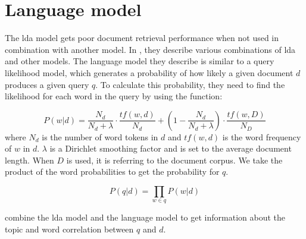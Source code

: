 \section{Language model}
The \gls{lda} model gets poor document retrieval performance when not used in combination with another model\cite{yang2009topic}.
In \cite{yang2009topic}, they describe various combinations of \gls{lda} and other models. 
The language model they describe is similar to a query likelihood model, which generates a probability of how likely a given document $d$ produces a given query $q$.
To calculate this probability, they need to find the likelihood for each word in the query by using the function:

$$ P(w|d) = \frac{N_d}{N_d + \lambda} \cdot \frac{tf(w,d)}{N_d} + (1 - \frac{N_d}{N_d + \lambda}) \cdot \frac{tf(w,D)}{N_D} $$
where $N_d$ is the number of word tokens in $d$ and $tf(w,d)$ is the word frequency of $w$ in $d$. $\lambda$ is a Dirichlet smoothing factor and is set to the average document length.
When $D$ is used, it is referring to the document corpus.
We take the product of the word probabilities to get the probability for $q$.

$$ P(q|d) = \prod_{w \in q} P(w|d) $$
 
\cite{yang2009topic} combine the \gls{lda} model and the language model to get information about the topic and word correlation between $q$ and $d$.
